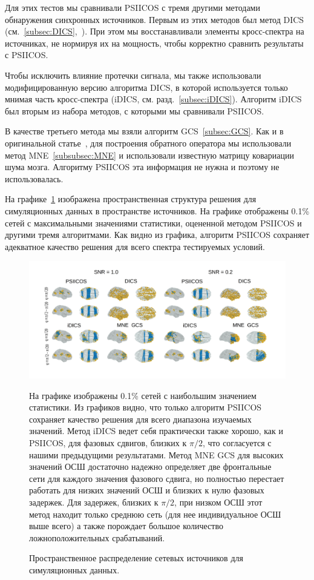 Для этих тестов мы сравнивали PSIICOS с тремя другими методами обнаружения
синхронных источников. Первым из этих методов был метод DICS
(см.~\ref{subsec:DICS},~\cite{Gross2001}).  При этом мы восстанавливали
элементы кросс-спектра на источниках, не нормируя их на мощность, чтобы
корректно сравнить результаты с PSIICOS.\@

Чтобы исключить влияние протечки сигнала, мы также использовали
модифицированную версию алгоритма DICS, в которой используется только мнимая
часть кросс-спектра (iDICS, см. разд.~\ref{subsec:iDICS}). Алгоритм iDICS был
вторым из набора методов, с которыми мы сравнивали PSIICOS.\@

В качестве третьего метода мы взяли алгоритм GCS~\ref{subsec:GCS}.  Как и в
оригинальной статье~\cite{Wens2015}, для построения обратного оператора мы
использовали метод MNE~\ref{subsubsec:MNE} и использовали известную матрицу
ковариации шума мозга. Алгоритму PSIICOS эта информация не нужна и поэтому не
использовалась.

На графике~\ref{fig:05} изображена пространственная структура решения для
симуляционных данных в пространстве источников. На графике отображены 0.1\% сетей
с максимальными значениями статистики, оцененной методом PSIICOS и другими тремя
алгоритмами. Как видно из графика, алгоритм PSIICOS сохраняет адекватное качество решения
для всего спектра тестируемых условий.

\begin{figure}[!ht]
 \includegraphics[width=1\textwidth]{../images/psiicos_paper/Figure5_hr.jpg}
 \caption{Пространственное распределение сетевых источников для симуляционных данных.}\label{fig:05} %
     На графике изображены 0.1\% сетей с наибольшим значением
     статистики. Из графиков видно, что только алгоритм PSIICOS сохраняет
     качество решения для всего диапазона изучаемых значений.
     Метод iDICS ведет себя практически также хорошо, как и PSIICOS,
     для фазовых сдвигов, близких к $\pi/2$, что согласуется с нашими предыдущими
     результатами. Метод MNE GCS для высоких значений ОСШ достаточно надежно определяет
     две фронтальные сети для каждого значения фазового сдвига, но полностью перестает
     работать для низких значений ОСШ и близких к нулю фазовых задержек. Для задержек,
     близких к $\pi/2$, при низком ОСШ этот метод находит только среднюю сеть
     (для нее индивидуальное ОСШ выше всего) а также порождает большое количество
     ложноположительных срабатываний.
\end{figure}%

